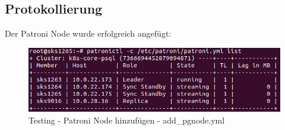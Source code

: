 
\clearpage
{}
\recalctypearea
\begin{flushleft}
    \subsection{Protokollierung}
    
\end{flushleft}
\clearpage
{}
\recalctypearea
\begin{flushleft}
    Der Patroni Node wurde erfolgreich angefügt:
    \begin{figure}[H]
        \centering
        \includegraphics[width=1\linewidth]{source/implementation/construction_implementation/testing/testing_add_pgnode_result}
        \caption{Testing - Patroni Node hinzufügen - add\_pgnode.yml}
        \label{fig:testing_add_pgnode_result}
    \end{figure}
\end{flushleft}